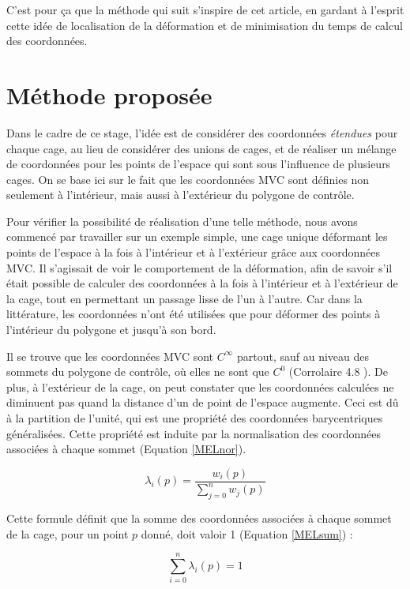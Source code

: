C'est pour ça que la méthode qui suit s'inspire de cet article, en
gardant à l'esprit cette idée de localisation de la déformation et de
minimisation du temps de calcul des coordonnées.

\section{Méthode proposée}
Dans le cadre de ce stage, l'idée est de considérer des coordonnées
\textit{étendues} pour chaque cage, au lieu de considérer des unions
de cages, et de réaliser un mélange de coordonnées pour les points de
l'espace qui sont sous l'influence de plusieurs cages. On se base ici
sur le fait que les coordonnées MVC sont définies non seulement à
l'intérieur, mais aussi à l'extérieur du polygone de contrôle.

Pour vérifier la possibilité de réalisation d'une telle méthode, nous
avons commencé par travailler sur un exemple simple, une cage unique
déformant les points de l'espace à la fois à l'intérieur et à
l'extérieur grâce aux coordonnées MVC. Il s'agissait de voir le
comportement de la déformation, afin de savoir s'il était possible de
calculer des coordonnées à la fois à l'intérieur et à l'extérieur de
la cage, tout en permettant un passage lisse de l'un à l'autre. Car
dans la littérature, les coordonnées n'ont été utilisées que pour
déformer des points à l'intérieur du polygone et jusqu'à son bord.

Il se trouve que les coordonnées MVC sont $C^\infty$ partout, sauf au
niveau des sommets du polygone de contrôle, où elles ne sont que $C^0$
(Corrolaire 4.8 \cite{HF06}). De plus, à l'extérieur de la cage, on
peut constater que les coordonnées calculées ne diminuent pas quand la
distance d'un de point de l'espace augmente. Ceci est dû à la
partition de l'unité, qui est une propriété des coordonnées
barycentriques généralisées. Cette propriété est induite par la
normalisation des coordonnées associées à chaque sommet (Equation
\ref{MELnor}).

\begin{equation}
  \lambda_i(p) = \frac{w_i(p)}{\sum_{j=0}^n w_j(p)}
  \label{MELnor}
\end{equation}

Cette formule définit que la somme des coordonnées associées à chaque
sommet de la cage, pour un point $p$ donné, doit valoir 1 (Equation
\ref{MELsum}) :

\begin{equation}
  \sum_{i=0}^n \lambda_i(p) = 1
  \label{MELsum}
\end{equation}


